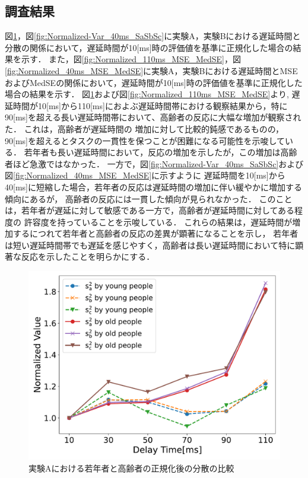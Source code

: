 \subsection{調査結果}
図\ref{fig:Normalized-Var_110ms_SaSbSc}，図\ref{fig:Normalized-Var_40ms_SaSbSc}に実験A，実験Bにおける遅延時間と分散の関係において，遅延時間が10[ms]時の評価値を基準に正規化した場合の結果を示す．
また，図\ref{fig:Normalized_110ms_MSE_MedSE}，図\ref{fig:Normalized_40ms_MSE_MedSE}に実験A，実験Bにおける遅延時間とMSEおよびMedSEの関係において，遅延時間が10[ms]時の評価値を基準に正規化した場合の結果を示す．
図\ref{fig:Normalized-Var_110ms_SaSbSc}および図\ref{fig:Normalized_110ms_MSE_MedSE}より,
遅延時間が10[ms]から110[ms]におよぶ遅延時間帯における観察結果から，特に90[ms]を超える長い遅延時間帯において、高齢者の反応に大幅な増加が観察された．
これは，高齢者が遅延時間の
増加に対して比較的鈍感であるものの，90[ms]を超えるとタスクの一貫性を保つことが困難になる可能性を示唆している．
若年者も長い遅延時間において，反応の増加を示したが，この増加は高齢者ほど急激ではなかった．
一方で，図\ref{fig:Normalized-Var_40ms_SaSbSc}および図\ref{fig:Normalized_40ms_MSE_MedSE}に示すように
遅延時間を10[ms]から40[ms]に短縮した場合，若年者の反応は遅延時間の増加に伴い緩やかに増加する傾向にあるが，
高齢者の反応には一貫した傾向が見られなかった．
このことは，若年者が遅延に対して敏感である一方で，高齢者が遅延時間に対してある程度の
許容度を持っていることを示唆している．
これらの結果は，遅延時間が増加するにつれて若年者と高齢者の反応の差異が顕著になることを示し，
若年者は短い遅延時間帯でも遅延を感じやすく，高齢者は長い遅延時間において特に顕著な反応を示したことを明らかにする．
\begin{figure}[tbp]
  \centering
  \includegraphics[scale=0.3]{figures/Honbann/Comparison_young_old/110_var_normalized.pdf}
  \caption{実験Aにおける若年者と高齢者の正規化後の分散の比較}
  \label{fig:Normalized-Var_110ms_SaSbSc}
\end{figure}
